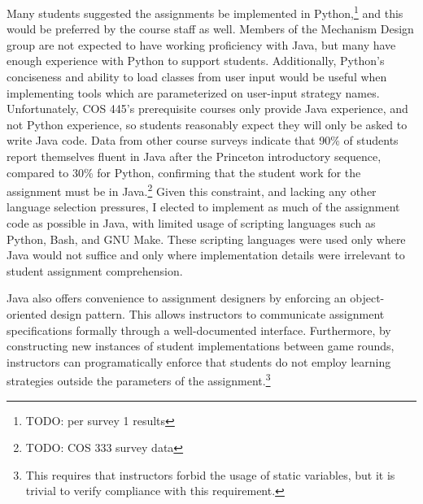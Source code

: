\documentclass[pageno]{jpaper}
\begin{document}
Many students suggested the assignments be implemented in Python,\footnote{TODO: per survey 1 results} and this would be preferred by the course staff as well.
Members of the Mechanism Design group are not expected to have working proficiency with Java, but many have enough experience with Python to support students.
Additionally, Python's conciseness and ability to load classes from user input would be useful when implementing tools which are parameterized on user-input strategy names.
Unfortunately, COS 445's prerequisite courses only provide Java experience, and not Python experience, so students reasonably expect they will only be asked to write Java code.
Data from other course surveys indicate that 90\% of students report themselves fluent in Java after the Princeton introductory sequence, compared to 30\% for Python, confirming that the student work for the assignment must be in Java.\footnote{TODO: COS 333 survey data}
Given this constraint, and lacking any other language selection pressures, I elected to implement as much of the assignment code as possible in Java, with limited usage of scripting languages such as Python, Bash, and GNU Make.
These scripting languages were used only where Java would not suffice and only where implementation details were irrelevant to student assignment comprehension.

Java also offers convenience to assignment designers by enforcing an object-oriented design pattern.
This allows instructors to communicate assignment specifications formally through a well-documented interface.
Furthermore, by constructing new instances of student implementations between game rounds, instructors can programatically enforce that students do not employ learning strategies outside the parameters of the assignment.\footnote{This requires that instructors forbid the usage of static variables, but it is trivial to verify compliance with this requirement.}
\end{document}
